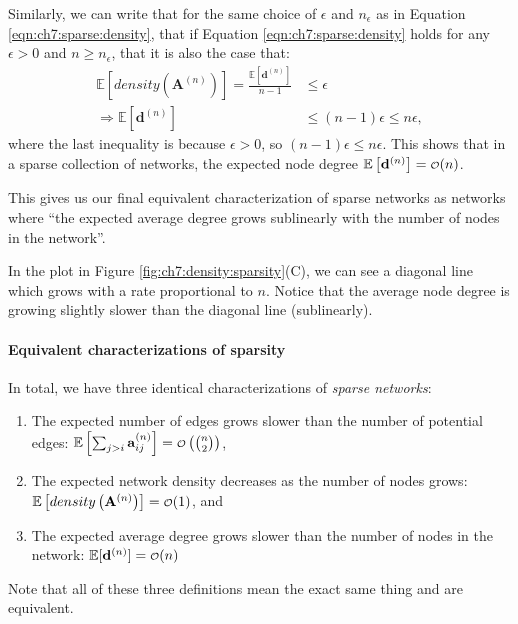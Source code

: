Similarly, we can write that for the same choice of $\epsilon$ and $n_\epsilon$ as in Equation \eqref{eqn:ch7:sparse:density}, that if Equation \eqref{eqn:ch7:sparse:density} holds for any $\epsilon > 0$ and $n \geq n_\epsilon$, that it is also the case that:
\begin{align*}
    \mathbb E\left[density\left(\mathbf A^{(n)}\right)\right] = \frac{\mathbb E[\mathbf d^{(n)}]}{n - 1} &\leq \epsilon \\
    \Rightarrow \mathbb E[\mathbf d^{(n)}] &\leq (n - 1)\epsilon \leq n\epsilon,
\end{align*}
where the last inequality is because $\epsilon > 0$, so $(n - 1)\epsilon \leq n\epsilon$. This shows that in a sparse collection of networks, the expected node degree $\mathbb E\left[\mathbf d^{(n)}\right] = \smallO(n)$. 

This gives us our final equivalent characterization of sparse networks as networks where ``the expected average degree grows sublinearly with the number of nodes in the network''.

In the plot in Figure \ref{fig:ch7:density:sparsity}(C), we can see a diagonal line which grows with a rate proportional to $n$. Notice that the average node degree is growing slightly slower than the diagonal line (sublinearly).

\paragraph*{Equivalent characterizations of sparsity}
In total, we have three identical characterizations of \textit{sparse networks}:
\begin{enumerate}
    \item The expected number of edges grows slower than the number of potential edges: $\mathbb E\left[\sum_{j > i}\mathbf a_{ij}^{(n)}\right] = \smallO\left(\binom n 2\right)$,
    \item The expected network density decreases as the number of nodes grows: $\mathbb E\left[density\left(\mathbf A^{(n)}\right)\right] = \smallO(1)$, and
    \item The expected average degree grows slower than the number of nodes in the network: $\mathbb E[\mathbf d^{(n)}] = \smallO(n)$
\end{enumerate}
Note that all of these three definitions mean the exact same thing and are equivalent.

